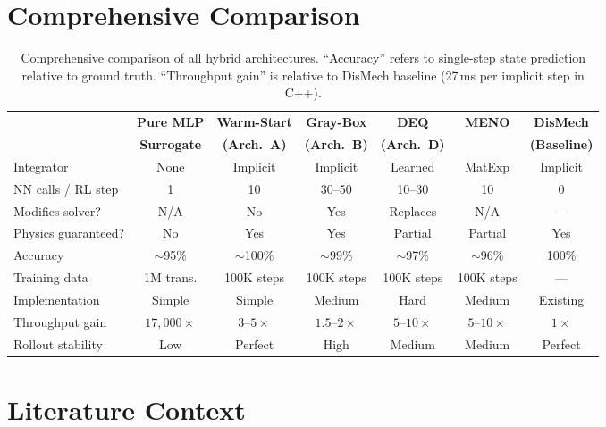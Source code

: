 \documentclass[11pt]{article}
\begin{document}
\section{Comprehensive Comparison}
\label{sec:full-comparison}

\begin{table}[H]
  \centering
  \renewcommand{\arraystretch}{1.25}
  \scriptsize
  \begin{tabular}{p{2.5cm}cccccc}
    \toprule
    & \textbf{Pure MLP} & \textbf{Warm-Start} & \textbf{Gray-Box} & \textbf{DEQ} & \textbf{MENO} & \textbf{DisMech} \\
    & \textbf{Surrogate} & \textbf{(Arch.\ A)} & \textbf{(Arch.\ B)} & \textbf{(Arch.\ D)} & & \textbf{(Baseline)} \\
    \midrule
    Integrator & None & Implicit & Implicit & Learned & MatExp & Implicit \\
    NN calls / RL step & 1 & 10 & 30--50 & 10--30 & 10 & 0 \\
    Modifies solver? & N/A & No & Yes & Replaces & N/A & --- \\
    Physics guaranteed? & No & Yes & Yes & Partial & Partial & Yes \\
    Accuracy & $\sim$95\% & $\sim$100\% & $\sim$99\% & $\sim$97\% & $\sim$96\% & 100\% \\
    Training data & 1M trans. & 100K steps & 100K steps & 100K steps & 100K steps & --- \\
    Implementation & Simple & Simple & Medium & Hard & Medium & Existing \\
    Throughput gain & $17{,}000\times$ & $3$--$5\times$ & $1.5$--$2\times$ & $5$--$10\times$ & $5$--$10\times$ & $1\times$ \\
    Rollout stability & Low & Perfect & High & Medium & Medium & Perfect \\
    \bottomrule
  \end{tabular}
  \caption{Comprehensive comparison of all hybrid architectures.  ``Accuracy'' refers to single-step state prediction relative to ground truth.  ``Throughput gain'' is relative to DisMech baseline (27\,ms per implicit step in C++).}
  \label{tab:full-comparison}
\end{table}


\section{Literature Context}
\label{sec:literature}
\end{document}
